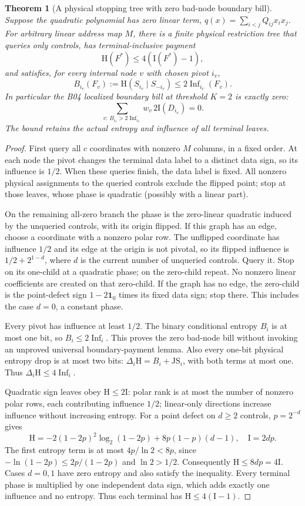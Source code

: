 \documentclass[11pt]{article}
\newtheorem{theorem}{Theorem}
\newcommand{\I}{\mathrm I}
\newcommand{\Ent}{\mathrm H}
\begin{document}
\begin{theorem}[A physical stopping tree with zero bad-node boundary bill]
Suppose the quadratic polynomial has zero linear term,
$q(x)=\sum_{i<j}Q_{ij}x_ix_j$. For arbitrary linear address map $M$,
there is a finite physical restriction tree that queries only controls,
has terminal-inclusive payment
\[
 \Ent(F^*)\le4(\I(F^*)-1),
\]
and satisfies, for every internal node $v$ with chosen pivot $i_v$,
\[
 B_{i_v}(F_v):=\Ent(S_{i_v}\mid S_{-i_v})\le2\operatorname{Inf}_{i_v}(F_v).
\]
In particular the B04 localized boundary bill at threshold $K=2$ is
exactly zero:
\[
 \sum_{v:\, B_{i_v}>2\operatorname{Inf}_{i_v}}
        w_v\,2\I(D_{i_v})=0.
\]
The bound retains the actual entropy and influence of all terminal leaves.
\end{theorem}
\begin{proof}
First query all $c$ coordinates with nonzero $M$ columns, in a fixed
order. At each node the pivot changes the terminal data label to a
distinct data sign, so its influence is $1/2$. When these queries finish,
the data label is fixed. All nonzero physical assignments to the queried
controls exclude the flipped point; stop at those leaves, whose phase
is quadratic (possibly with a linear part).

On the remaining all-zero branch the phase is the zero-linear
quadratic induced by the unqueried controls, with its origin flipped.
If this graph has an edge, choose a coordinate with a nonzero polar
row. The unflipped coordinate has influence $1/2$ and its edge at
the origin is not pivotal, so its flipped influence is
$1/2+2^{1-d}$, where $d$ is the current number of unqueried controls.
Query it. Stop on its one-child at a quadratic phase; on the zero-child
repeat. No nonzero linear coefficients are created on that zero-child.
If the graph has no edge, the zero-child is the point-defect sign
$1-2\mathbf1_0$ times its fixed data sign; stop there. This includes
the case $d=0$, a constant phase.

Every pivot has influence at least $1/2$. The binary conditional
entropy $B_i$ is at most one bit, so $B_i\le2\operatorname{Inf}_i$.
This proves the zero bad-node bill without invoking an unproved
universal boundary-payment lemma. Also every one-bit physical entropy
drop is at most two bits: $\Delta_i\Ent=B_i+\mathrm{JS}_i$, with
both terms at most one. Thus $\Delta_i\Ent\le4\operatorname{Inf}_i$.

Quadratic sign leaves obey $\Ent\le2\I$: polar rank is at most the
number of nonzero polar rows, each contributing influence $1/2$;
linear-only directions increase influence without increasing entropy.
For a point defect on $d\ge2$ controls, $p=2^{-d}$ gives
\[
 \Ent= -2(1-2p)^2\log_2(1-2p)+8p(1-p)(d-1),\quad \I=2dp.
\]
The first entropy term is at most $4p/\ln2<8p$, since
$-\ln(1-2p)\le2p/(1-2p)$ and $\ln2>1/2$. Consequently
$\Ent\le8dp=4\I$. Cases $d=0,1$ have zero entropy and also satisfy
the inequality. Every terminal phase is multiplied by one independent
data sign, which adds exactly one influence and no entropy. Thus
each terminal has $\Ent\le4(\I-1)$.


\end{proof}
\end{document}
